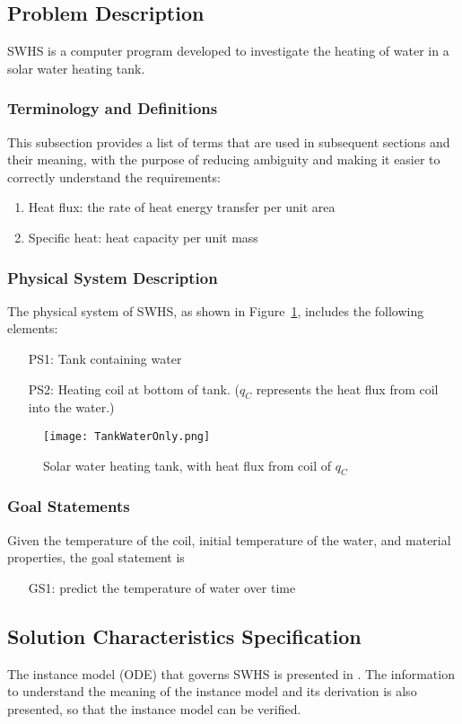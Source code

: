 \documentclass[12pt]{article}
\begin{document}
\subsection{Problem Description}
\label{Sec:PD}
SWHS is a computer program developed to investigate the heating of water in a solar water heating tank.
\subsubsection{Terminology and Definitions}
\label{Sec:TaD}
This subsection provides a list of terms that are used in subsequent sections and their meaning, with the purpose of reducing ambiguity and making it easier to correctly understand the requirements:
\begin{enumerate}
\item{Heat flux: the rate of heat energy transfer per unit area}
\item{Specific heat: heat capacity per unit mass}
\end{enumerate}
\subsubsection{Physical System Description}
\label{Sec:PSD}
The physical system of SWHS, as shown in Figure~\ref{Figure:Swhtwhffco}, includes the following elements:
\begin{itemize}
\item[PS1:]Tank containing water
\item[PS2:]Heating coil at bottom of tank. ($q_{C}$ represents the heat flux from coil into the water.)
\end{itemize}
\begin{figure}
\begin{center}
\texttt{[image: TankWaterOnly.png]}
\caption{Solar water heating tank, with heat flux from coil of $q_{C}$}
\label{Figure:Swhtwhffco}
\end{center}
\end{figure}
\subsubsection{Goal Statements}
\label{Sec:GS}
Given the temperature of the coil, initial temperature of the water, and material properties, the goal statement is
\begin{itemize}
\item[GS1:]predict the temperature of water over time
\end{itemize}
\subsection{Solution Characteristics Specification}
\label{Sec:SCS}
The instance model (ODE) that governs SWHS is presented in . The information to understand the meaning of the instance model and its derivation is also presented, so that the instance model can be verified.
\end{document}
